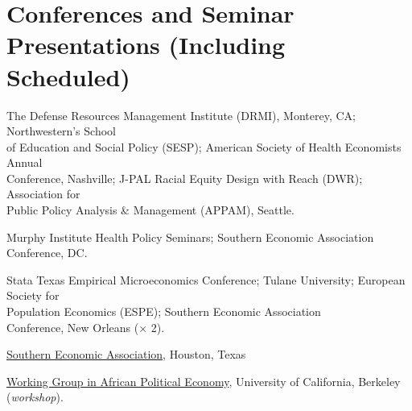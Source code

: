 \documentclass[letterpaper]{article}
\renewenvironment{itemize}{
  \begin{list}{}{
    \setlength{\leftmargin}{1.5em}
  }
}{
  \end{list}
}
\begin{document}
\section*{Conferences and Seminar Presentations (Including Scheduled)}
\vspace{2 mm}
\begin{itemize}
\item {}The Defense Resources Management Institute (DRMI), Monterey, CA; Northwestern’s School \\{\makebox[1.8cm]{\hfill}}of Education and Social Policy (SESP); American Society of Health Economists Annual \\{\makebox[1.8cm]{\hfill}}Conference, Nashville; J-PAL Racial Equity Design with Reach (DWR); Association for \\{\makebox[1.8cm]{\hfill}}Public Policy Analysis \& Management (APPAM), Seattle.
\item {}Murphy Institute Health Policy Seminars; Southern Economic Association \\{\makebox[1.8cm]{\hfill}}Conference, DC.
\studentnote
\item {}Stata Texas Empirical Microeconomics Conference; Tulane University; European Society for \\{\makebox[1.8cm]{\hfill}}Population Economics (ESPE); Southern Economic Association \\{\makebox[1.8cm]{\hfill}}Conference, New Orleans ($\times$ 2).
\item {}\href{https://www.southerneconomic.org/session-details/?conferenceId=7&eventId=3353}%
{Southern Economic Association}, Houston, Texas
\item {}\href{https://cega.berkeley.edu/initiative/working-group-in-african-political-economy/}%
{Working Group in African Political Economy}, University of  California, Berkeley (\textit{workshop}).

\end{itemize}

\vspace{2 mm}
\end{document}
